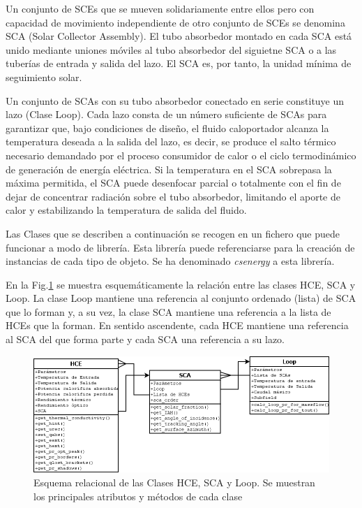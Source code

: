 Un conjunto de SCEs que se mueven solidariamente entre ellos pero con capacidad de movimiento independiente de otro conjunto de SCEs se denomina SCA (Solar Collector Assembly). El tubo absorbedor montado en cada SCA está unido mediante uniones móviles al tubo absorbedor del siguietne SCA o a las tuberías de entrada y salida del lazo. El SCA es, por tanto, la unidad mínima de seguimiento solar.

Un conjunto de SCAs con su tubo absorbedor conectado en serie constituye un lazo (Clase Loop). Cada lazo consta de un número suficiente de SCAs para garantizar que, bajo condiciones de diseño, el fluido caloportador alcanza la temperatura deseada a la salida del lazo, es decir, se produce el salto térmico necesario demandado por el proceso consumidor de calor o el ciclo termodinámico de generación de energía eléctrica. Si la temperatura en el SCA sobrepasa la máxima permitida, el SCA puede desenfocar parcial o totalmente con el fin de dejar de concentrar radiación sobre el tubo absorbedor, limitando el aporte de calor y estabilizando la temperatura de salida del fluido.

Las Clases que se describen a continuación se recogen en un fichero que puede funcionar a modo de librería. Esta librería puede referenciarse para la creación de instancias de cada tipo de objeto. Se ha denominado \textit{csenergy} a esta librería.

En la Fig.\ref{fig:clasescsenergy1} se muestra esquemáticamente la relación entre las clases HCE, SCA y Loop. La clase Loop mantiene una  referencia al conjunto ordenado (lista) de SCA que lo forman y, a su vez, la clase SCA mantiene una referencia a la lista de HCEs que la forman. En sentido ascendente, cada HCE  mantiene una referencia al SCA del que forma parte y cada SCA una referencia a su lazo. 

\begin{figure}[H]
\includegraphics[width=0.9\linewidth]{images/clasescsenergy1.png}
\caption[Esquema relacional de las Clases HCE, SCA y Loop]{Esquema relacional de las Clases HCE, SCA y Loop. Se muestran los principales atributos y métodos de cada clase} 
\label{fig:clasescsenergy1}
\end{figure}


